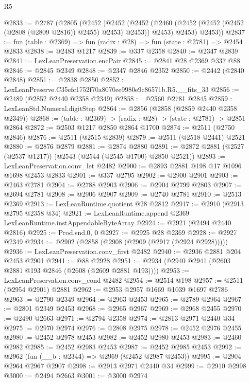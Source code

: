 \begin{lexlean}{R5}
\begin{coremodule}
@2833 := @2787
    (@2805
      (@2452
        (@2452
          (@2452 (@2460 (@2452 (@2452 (@2452 (@2808 (@2809 @2816)) @2455) @2453) @2453)) @2453)
          @2453)
        @2453))
@2837 := fun (table : @2369) => fun (radix : @28) => fun (state : @2781) => @2454 @2833
@2838 := @2483 @1217
@2839 := @337 @2358
@2840 := @2347 @2839
@2841 := LexLeanPreservation.encPair
@2845 := @2841 @28 @2369 @337 @88
@2846 := @2845 @2349
@2848 := @2347 @2846 @2352
@2850 := @2442 (@2840 @2848)
@2851 := @2838 @2850
@2852 := LexLeanPreserve.C35efc1752f70a8070ee9980e9c86571b.R5.__fits_33
@2856 := @2489 (@2852 @2440 @2358 @2349)
@2858 := @2560 @2781 @2845
@2859 := LexLeanStd.Numeral.digitStep
@2864 := @2856 (@2858 (@2859 @2440 @2358 @2349))
@2868 := (table : @2369) -> (radix : @28) -> (state : @2781) -> @2851 @2864
@2872 := @2503 @1217 @2850 @2864 @1700
@2874 := @2511 (@2750 @2846)
@2876 := @2511 (@2515 @2839)
@2879 := @2511 (@2518 @2441) @2521
@2880 := @2876 @2879
@2881 := @2874 @2880
@2891 := @2872 @2881 (@2527 (@2537 @1217)) (@2543 (@2544 (@2545 @1700) @2850 @2521))
@2893 := LexLeanPreservation.conv_let @2482
@2900 := @2893 @2881 @198 @17 @1096 @1698 @2453 @2833
@2901 := @337 @2795
@2902 := @2900 @2901
@2903 := @2463 @2781
@2904 := @2788 @2903
@2906 := @2904 @2799 @2803
@2907 := @2694 @2781
@2908 := @2906 @2907
@2909 := @2740 @2781
@2910 := @2513 @2369
@2913 := LexLeanRuntime.quotient @28 @2812
@2917 := @2910 (@2913 @2795 @2358 @34)
@2921 := LexLeanRuntime.append @2369 LexLeanRuntime.instAppendableByteArray
@2924 := @2921 (@2494 @2440 @2816)
@2925 := Prod.snd.{0, 0}
@2927 := @2925 @28 @2369
@2928 := @2927 @2349
@2934 := @2902 (@2858 (@2908 (@2909 (@2917 (@2924 @2928)))))
@2936 := LexLeanPreservation.conv_first @2482
@2940 := @2936 @2881 @204 @2453 @2901
@2941 := @88 @2928
@2951 := @2934 (@2940 @2941 (@2603 @2881 @193 @2846 (@2608 (@2609 @2881 @193))))
@2953 := LexLeanPreservation.conv_cond @2482
@2954 := @2514 @198
@2957 := @2511 (@2954 @2901) @2881
@2962 := @2953 @2957 @1669 @1039 @1697 @2786
@2963 := @2790 @2349
@2964 := @2963 @2453
@2965 := @2789 @2964
@2967 := @2801 @2349 @2453
@2968 := @2965 @2967
@2969 := @2968 @2455
@2970 := @2490 @2663
@2971 := @2794 @2358
@2974 := @2813 @2971 @2440 @34
@2975 := @2970 @2974
@2976 := @2808 @2975
@2978 := @2452 @2976 @2455
@2980 := @2452 @2978 @2453
@2982 := @2452 @2980 @2453
@2983 := @2460 @2982
@2985 := @2452 @2983 @2453
@2987 := @2452 @2985 @2453
@2992 := @2962 (fun (__b : @2344) => @2969 (@2452 @2987 @2453))
@2995 := @2904 @2964 @2967 @2907
@2998 := @2913 @2971 @2440 @34
@2999 := @2910 @2998
@3000 := @2494 @2663
@3001 := @3000 @2974

\end{coremodule}
\end{lexlean}
